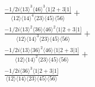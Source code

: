 \documentclass[varwidth, border=5pt]{standalone}
\begin{document}
\begin{my}
$\begin{gathered}
\scriptscriptstyle\frac{-1/2i\langle13\rangle^3\langle46\rangle^3\langle1|2+3|1]}{\langle12\rangle\langle14\rangle^4\langle23\rangle\langle45\rangle\langle56\rangle}+\\
\scriptscriptstyle\frac{-1/2i\langle13\rangle^2\langle36\rangle\langle46\rangle^2\langle1|2+3|1]}{\langle12\rangle\langle14\rangle^3\langle23\rangle\langle45\rangle\langle56\rangle}+\\
\scriptscriptstyle\frac{-1/2i\langle13\rangle\langle36\rangle^2\langle46\rangle\langle1|2+3|1]}{\langle12\rangle\langle14\rangle^2\langle23\rangle\langle45\rangle\langle56\rangle}+\\
\scriptscriptstyle\frac{-1/2i\langle36\rangle^3\langle1|2+3|1]}{\langle12\rangle\langle14\rangle\langle23\rangle\langle45\rangle\langle56\rangle}\phantom{+}
\end{gathered}$
\end{my}
\end{document}
